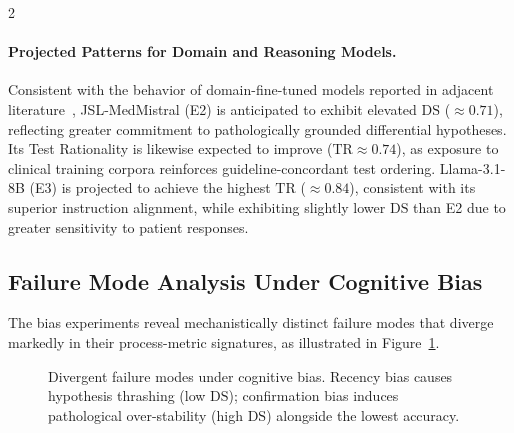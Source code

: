\documentclass[10pt, a4paper]{article}
\newcommand{\DS}{\mathrm{DS}}
\newcommand{\TR}{\mathrm{TR}}
\begin{document}
\begin{multicols}{2}
\paragraph{Projected Patterns for Domain and Reasoning Models.}
Consistent with the behavior of domain-fine-tuned models reported in adjacent literature~\cite{chen2023meditron}, JSL-MedMistral (E2) is anticipated to exhibit elevated $\DS$ ($\approx 0.71$), reflecting greater commitment to pathologically grounded differential hypotheses. Its Test Rationality is likewise expected to improve ($\TR \approx 0.74$), as exposure to clinical training corpora reinforces guideline-concordant test ordering. Llama-3.1-8B (E3) is projected to achieve the highest $\TR$ ($\approx 0.84$), consistent with its superior instruction alignment, while exhibiting slightly lower $\DS$ than E2 due to greater sensitivity to patient responses.

\subsection{Failure Mode Analysis Under Cognitive Bias}
\label{ssec:bias_results}

The bias experiments reveal mechanistically distinct failure modes that diverge markedly in their process-metric signatures, as illustrated in Figure~\ref{fig:bias_impact}.

\begin{figure}[H]
\centering
{}
\caption{Divergent failure modes under cognitive bias. Recency bias causes hypothesis thrashing (low $\DS$); confirmation bias induces pathological over-stability (high $\DS$) alongside the lowest accuracy.}
\label{fig:bias_impact}
\end{figure}


\end{multicols}
\end{document}
